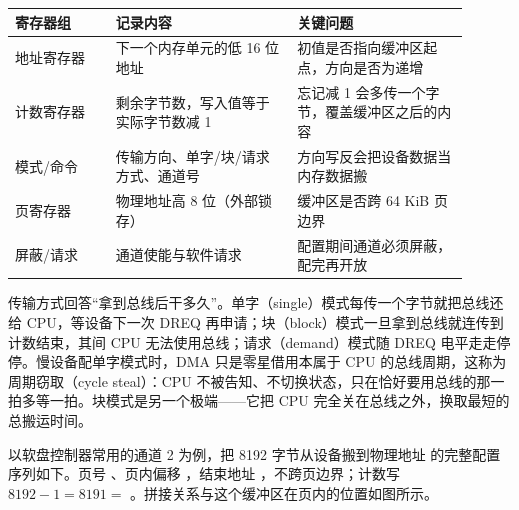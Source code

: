 \begin{longtable}{L{0.20\linewidth}L{0.36\linewidth}L{0.34\linewidth}}
\toprule
寄存器组 & 记录内容 & 关键问题 \\
\midrule
地址寄存器 & 下一个内存单元的低 16 位地址 & 初值是否指向缓冲区起点，方向是否为递增 \\
计数寄存器 & 剩余字节数，写入值等于实际字节数减 1 & 忘记减 1 会多传一个字节，覆盖缓冲区之后的内容 \\
模式/命令 & 传输方向、单字/块/请求方式、通道号 & 方向写反会把设备数据当内存数据搬 \\
页寄存器 & 物理地址高 8 位（外部锁存） & 缓冲区是否跨 64 KiB 页边界 \\
屏蔽/请求 & 通道使能与软件请求 & 配置期间通道必须屏蔽，配完再开放 \\
\bottomrule
\end{longtable}

传输方式回答“拿到总线后干多久”。单字（single）模式每传一个字节就把总线还给 CPU，等设备下一次 DREQ 再申请；块（block）模式一旦拿到总线就连传到计数结束，其间 CPU 无法使用总线；请求（demand）模式随 DREQ 电平走走停停。慢设备配单字模式时，DMA 只是零星借用本属于 CPU 的总线周期，这称为周期窃取（cycle steal）：CPU 不被告知、不切换状态，只在恰好要用总线的那一拍多等一拍。块模式是另一个极端——它把 CPU 完全关在总线之外，换取最短的总搬运时间。

以软盘控制器常用的通道 2 为例，把 8192 字节从设备搬到物理地址  的完整配置序列如下。页号 、页内偏移 ，结束地址 ，不跨页边界；计数写 $8192-1=8191=$ 。拼接关系与这个缓冲区在页内的位置如图所示。

